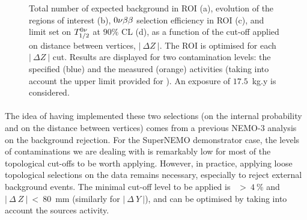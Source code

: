 \begin{figure}[!h]
\begin{subfigure}[t]{0.49\textwidth}
  \end{subfigure}
\caption{Total number of expected background in ROI (a),
  evolution of the regions of interest (b),
  $0\nu\beta\beta$ selection efficiency in ROI (c),
  and limit set on $T_{1/2}^{0\nu}$ at $90\%$ CL (d),
  as a function of the cut-off applied on distance between vertices, $|~\Delta Z~|$.
  The ROI is optimised for each $|~\Delta Z~|$ cut.
  Results are displayed for two contamination levels: the specified (blue) and the measured (orange) activities (taking into account the upper limit provided for \Bi).
  An exposure of $17.5$~kg.y is considered.
  \label{fig:cont_vertex}}
\end{figure}


\paragraph{}The idea of having implemented these two selections (on the internal probability and on the distance between vertices) comes from a previous NEMO-$3$ analysis on the background rejection.
For the SuperNEMO demonstrator case, the levels of contaminations we are dealing with is remarkably low for most of the topological cut-offs to be worth applying.
However, in practice, applying loose topological selections on the data remains necessary, especially to reject external background events.
The minimal cut-off level to be applied is \Pint~$>~4~\%$ and $|~\Delta~Z~|~<~80$~mm (similarly for $|~\Delta~Y~|$), and can be optimised by taking into account the sources activity.

